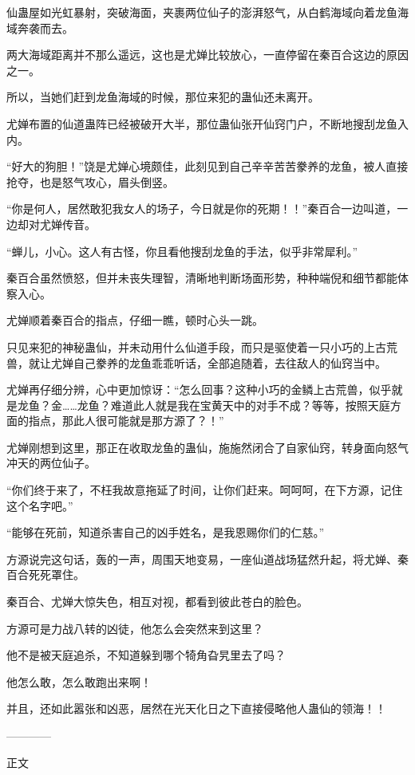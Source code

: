 \begin{this_body}
仙蛊屋如光虹暴射，突破海面，夹裹两位仙子的澎湃怒气，从白鹤海域向着龙鱼海域奔袭而去。

两大海域距离并不那么遥远，这也是尤婵比较放心，一直停留在秦百合这边的原因之一。

所以，当她们赶到龙鱼海域的时候，那位来犯的蛊仙还未离开。

尤婵布置的仙道蛊阵已经被破开大半，那位蛊仙张开仙窍门户，不断地搜刮龙鱼入内。

“好大的狗胆！”饶是尤婵心境颇佳，此刻见到自己辛辛苦苦豢养的龙鱼，被人直接抢夺，也是怒气攻心，眉头倒竖。

“你是何人，居然敢犯我女人的场子，今日就是你的死期！！”秦百合一边叫道，一边却对尤婵传音。

“蝉儿，小心。这人有古怪，你且看他搜刮龙鱼的手法，似乎非常犀利。”

秦百合虽然愤怒，但并未丧失理智，清晰地判断场面形势，种种端倪和细节都能体察入心。

尤婵顺着秦百合的指点，仔细一瞧，顿时心头一跳。

只见来犯的神秘蛊仙，并未动用什么仙道手段，而只是驱使着一只小巧的上古荒兽，就让尤婵自己豢养的龙鱼乖乖听话，全部追随着，去往敌人的仙窍当中。

尤婵再仔细分辨，心中更加惊讶：“怎么回事？这种小巧的金鳞上古荒兽，似乎就是龙鱼？金……龙鱼？难道此人就是我在宝黄天中的对手不成？等等，按照天庭方面的指点，那此人很可能就是那方源了？！”

尤婵刚想到这里，那正在收取龙鱼的蛊仙，施施然闭合了自家仙窍，转身面向怒气冲天的两位仙子。

“你们终于来了，不枉我故意拖延了时间，让你们赶来。呵呵呵，在下方源，记住这个名字吧。”

“能够在死前，知道杀害自己的凶手姓名，是我恩赐你们的仁慈。”

方源说完这句话，轰的一声，周围天地变易，一座仙道战场猛然升起，将尤婵、秦百合死死罩住。

秦百合、尤婵大惊失色，相互对视，都看到彼此苍白的脸色。

方源可是力战八转的凶徒，他怎么会突然来到这里？

他不是被天庭追杀，不知道躲到哪个犄角旮旯里去了吗？

他怎么敢，怎么敢跑出来啊！

并且，还如此嚣张和凶恶，居然在光天化日之下直接侵略他人蛊仙的领海！！

------------

正文

\end{this_body}

